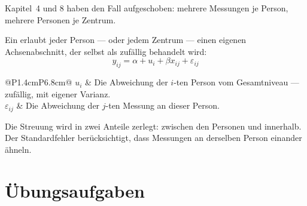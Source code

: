 \begin{merksatz}
Kapitel~4 und 8 haben den Fall aufgeschoben: mehrere Messungen je Person, mehrere Personen je Zentrum.

\begin{center}
\begin{minipage}{0.9\textwidth}
Ein  erlaubt jeder Person --- oder jedem Zentrum --- einen eigenen Achsenabschnitt, der selbst als zufällig behandelt wird:
\[ y_{ij} = \alpha + u_i + \beta x_{ij} + \varepsilon_{ij} \]
\end{minipage}
\end{center}

\begin{center}
\renewcommand{\arraystretch}{1.5}
\begin{tabular}{@{}P{1.4cm}P{6.8cm}@{}}
\toprule
$u_i$ & Die Abweichung der $i$-ten Person vom Gesamtniveau --- zufällig, mit eigener Varianz.\\
$\varepsilon_{ij}$ & Die Abweichung der $j$-ten Messung an dieser Person.\\
\bottomrule
\end{tabular}
\end{center}

Die Streuung wird in zwei Anteile zerlegt: zwischen den Personen und innerhalb. Der Standardfehler berücksichtigt, dass Messungen an derselben Person einander ähneln.

\begin{center}
\begin{minipage}{0.88\textwidth}
\end{minipage}
\end{center}
\end{merksatz}

\section{Übungsaufgaben}


